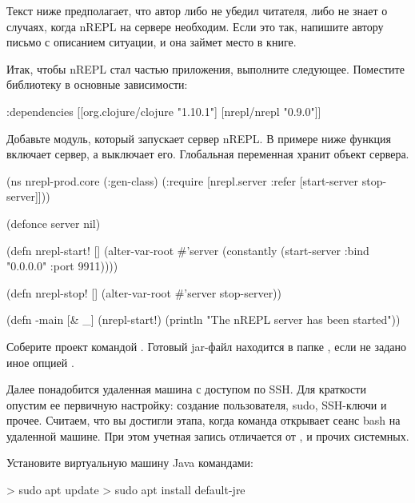 Текст ниже предполагает, что автор либо не убедил читателя, либо не знает о случаях, когда nREPL на сервере необходим. Если это так, напишите автору письмо с описанием ситуации, и она займет место в книге.

Итак, чтобы nREPL стал частью приложения, выполните следующее. Поместите библиотеку  в основные зависимости:

\begin{english}
  \begin{clojure}
  :dependencies
  [[org.clojure/clojure "1.10.1"]
   [nrepl/nrepl "0.9.0"]]
  \end{clojure}
\end{english}

Добавьте модуль, который запускает сервер nREPL. В примере ниже функция  включает сервер, а  выключает его. Глобальная переменная  хранит объект сервера.

\begin{english}
  \begin{clojure}
(ns nrepl-prod.core
  (:gen-class)
  (:require
   [nrepl.server :refer [start-server stop-server]]))

(defonce server nil)

(defn nrepl-start! []
  (alter-var-root
   #'server
   (constantly
    (start-server :bind "0.0.0.0" :port 9911))))

(defn nrepl-stop! []
  (alter-var-root #'server stop-server))

(defn -main
  [& _]
  (nrepl-start!)
  (println "The nREPL server has been started"))
  \end{clojure}
\end{english}

Соберите проект командой . Готовый jar-файл находится в папке , если не задано иное опцией .

Далее понадобится удаленная машина с доступом по SSH. Для краткости опустим ее первичную настройку: создание пользователя, sudo, SSH-ключи и прочее. Считаем, что вы достигли этапа, когда команда  открывает сеанс bash на удаленной машине. При этом учетная запись отличается от ,  и прочих системных.


Установите виртуальную машину Java командами:

\begin{english}
  \begin{bash}
> sudo apt update
> sudo apt install default-jre
  \end{bash}
\end{english}

